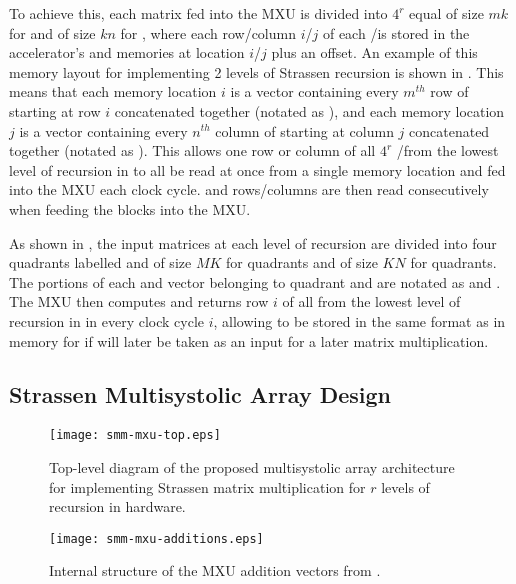 To achieve this, each \AB matrix fed into the MXU is divided into $4^r$ equal \subblocks of size $m$\by$k$ for \A and of size $k$\by$n$ for \B, where each row/column $i$/$j$ of each \A/\B \subblock is stored in the accelerator's \A and \B memories at location $i$/$j$ plus an offset.
An example of this memory layout for implementing 2 levels of Strassen recursion is shown in .
This means that each \A memory location $i$ is a vector containing every $m^{th}$ row of \A starting at row $i$ concatenated together (notated as \Av), and each \B memory location $j$ is a vector containing every $n^{th}$ column of \B starting at column $j$ concatenated together (notated as \Bv).
This allows one row or column of all $4^r$ \A/\B \subblocks from the lowest level of recursion in  to all be read at once from a single memory location and fed into the MXU each clock cycle.
\Av and \Bv rows/columns are then read consecutively when feeding the \AB blocks into the MXU.

As shown in , the input \AB matrices at each level of recursion are divided into four \block quadrants labelled \An and \Bn of size $M$\by$K$ for \An quadrants and of size $K$\by$N$ for \Bn quadrants.
The portions of each \Av and \Bv vector belonging to quadrant \An and \Bn are notated as \Anv and \Bnv.
The MXU then computes and returns row $i$ of all \C \subblocks from the lowest level of recursion in  in every clock cycle $i$, allowing \Cv to be stored in the same format as \A in memory for if \C will later be taken as an \A input for a later matrix multiplication.


\subsection{Strassen Multisystolic Array Design}
\begin{figure}
  \centering
  \texttt{[image: smm-mxu-top.eps]}
  \caption{Top-level diagram of the proposed \smmArch multisystolic array architecture for implementing Strassen matrix multiplication \seq for $r$ levels of recursion in hardware.}
  \label{smm:fig:smm-mxu}
\end{figure}
\begin{figure}
  \centering
  \texttt{[image: smm-mxu-additions.eps]}
  \caption{Internal structure of the \smmArch MXU addition vectors from .
  }
  \label{smm-add-units}
\end{figure}

